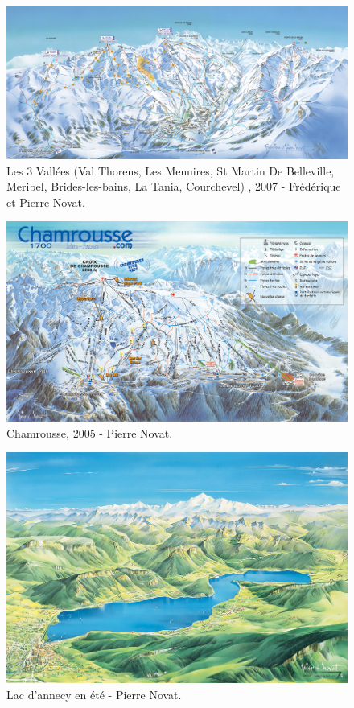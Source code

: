 \begin{figure}[h!]

   \centering
   \includegraphics[width=1.0\linewidth]{novat/3Vallees.jpg}
   \caption{Les 3 Vallées (Val Thorens, Les Menuires, St Martin De Belleville, Meribel, Brides-les-bains, La Tania, Courchevel) , 2007 - Frédérique et Pierre Novat.}
\end{figure}

\begin{figure}[h!]

   \centering
   \includegraphics[width=1.0\linewidth]{novat/chamrousse.jpg}
   \caption{Chamrousse, 2005 - Pierre Novat.}
\end{figure}

\begin{figure}[h!]

   \centering
   \includegraphics[width=1.0\linewidth]{novat/annecy-ete.jpg}
   \caption{Lac d'annecy en été - Pierre Novat.}
\end{figure}


